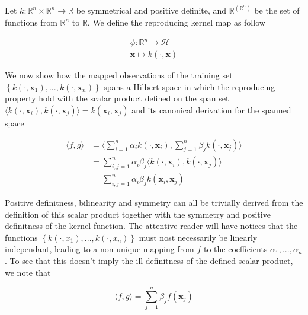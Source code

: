 Let $k : \mathbb{R}^n \times \mathbb{R}^n \rightarrow \mathbb{R}$ be symmetrical and positive definite, and $\mathbb{R}^{(\mathbb{R}^n)}$ be the set of functions from $\mathbb{R}^n$ to $\mathbb{R}$. We define the reproducing kernel map as follow

\begin{equation}
  \begin{aligned}
    \phi : \mathbb{R}^n \rightarrow \mathcal{H}\\
    \mathbf{x} \mapsto k(\cdot, \mathbf{x})
  \end{aligned}
\end{equation}

We now show how the mapped observations of the training set $\left\{k\left(\cdot, \mathbf{x}_1\right), ..., k\left(\cdot, \mathbf{x}_n\right)\right\}$ spans a Hilbert space in which the reproducing property hold with the scalar product defined on the span set $\langle k\left(\cdot, \mathbf{x}_i\right), k\left(\cdot, \mathbf{x}_j\right)\rangle = k\left(\mathbf{x}_i, \mathbf{x}_j\right)$ and its canonical derivation for the spanned space

\begin{equation*}
  \begin{aligned}
    \langle f, g\rangle 
    &= \langle \sum_{i=1}^n\alpha_ik(\cdot, \mathbf{x}_i), \sum_{j=1}^n\beta_jk(\cdot, \mathbf{x}_j)\rangle \\
    &= \sum_{i,j=1}^n\alpha_i\beta_j \langle k\left(\cdot, \mathbf{x}_i\right), k\left(\cdot, \mathbf{x}_j\right)\rangle \\
    &= \sum_{i,j=1}^n\alpha_i\beta_j k\left(\mathbf{x}_i, \mathbf{x}_j\right)
  \end{aligned}
\end{equation*}

Positive definitness, bilinearity and symmetry can all be trivially derived from the definition of this scalar product together with the symmetry and positive definitness of the kernel function. The attentive reader will have notices that the functions $\left\{k\left(\cdot, x_1\right), ..., k\left(\cdot, x_n\right)\right\}$ must nost necessarily be linearly independant, leading to a non unique mapping from $f$ to the coefficients $\alpha_1, ..., \alpha_n$. To see that this doesn't imply the ill-definitness of the defined scalar product, we note that

\begin{equation*}
  \langle f, g\rangle = \sum_{j=1}^n\beta_j f\left(\mathbf{x}_j\right)
\end{equation*}

